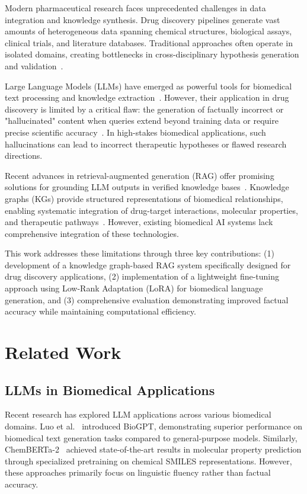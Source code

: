 \documentclass[conference]{IEEEtran}
\begin{document}
Modern pharmaceutical research faces unprecedented challenges in data integration and knowledge synthesis. Drug discovery pipelines generate vast amounts of heterogeneous data spanning chemical structures, biological assays, clinical trials, and literature databases. Traditional approaches often operate in isolated domains, creating bottlenecks in cross-disciplinary hypothesis generation and validation~\cite{schneider2020rethinking}.

Large Language Models (LLMs) have emerged as powerful tools for biomedical text processing and knowledge extraction~\cite{luo2022biogpt,chithrananda2020chemberta}. However, their application in drug discovery is limited by a critical flaw: the generation of factually incorrect or "hallucinated" content when queries extend beyond training data or require precise scientific accuracy~\cite{zhang2023survey,lin2022truthfulqa}. In high-stakes biomedical applications, such hallucinations can lead to incorrect therapeutic hypotheses or flawed research directions.

Recent advances in retrieval-augmented generation (RAG) offer promising solutions for grounding LLM outputs in verified knowledge bases~\cite{lewis2020retrieval}. Knowledge graphs (KGs) provide structured representations of biomedical relationships, enabling systematic integration of drug-target interactions, molecular properties, and therapeutic pathways~\cite{wang2019biokg}. However, existing biomedical AI systems lack comprehensive integration of these technologies.

This work addresses these limitations through three key contributions: (1) development of a knowledge graph-based RAG system specifically designed for drug discovery applications, (2) implementation of a lightweight fine-tuning approach using Low-Rank Adaptation (LoRA) for biomedical language generation, and (3) comprehensive evaluation demonstrating improved factual accuracy while maintaining computational efficiency.

\section{Related Work}
\label{sec:related}

\subsection{LLMs in Biomedical Applications}

Recent research has explored LLM applications across various biomedical domains. Luo et al.~\cite{luo2022biogpt} introduced BioGPT, demonstrating superior performance on biomedical text generation tasks compared to general-purpose models. Similarly, ChemBERTa-2~\cite{chithrananda2020chemberta} achieved state-of-the-art results in molecular property prediction through specialized pretraining on chemical SMILES representations. However, these approaches primarily focus on linguistic fluency rather than factual accuracy.
\end{document}
